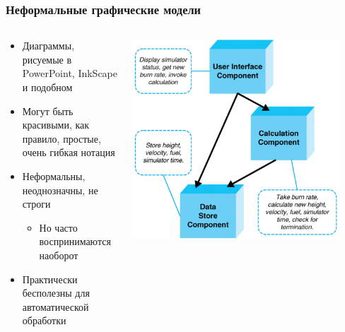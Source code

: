 \documentclass{../mcsslides}
\begin{document}
    \begin{frame}
        \frametitle{Неформальные графические модели}
        \begin{columns}
            \begin{column}{0.5\textwidth}
                \begin{itemize}
                    \item Диаграммы, рисуемые в PowerPoint, InkScape и подобном
                    \item Могут быть красивыми, как правило, простые, очень гибкая нотация
                    \item Неформальны, неоднозначны, не строги
                    \begin{itemize}
                        \item Но часто воспринимаются наоборот
                    \end{itemize}
                    \item Практически бесполезны для автоматической обработки
                \end{itemize}
            \end{column}
            \begin{column}{0.5\textwidth}
                \begin{center}
                    \includegraphics[width=0.9\textwidth]{informalModel.png}
                \end{center}
            \end{column}
        \end{columns}
    \end{frame}
\end{document}
